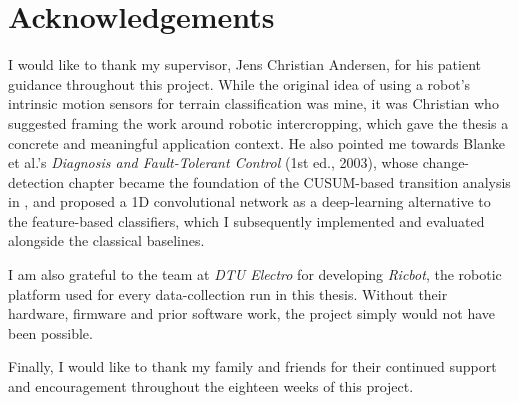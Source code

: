 \newpage
\section*{Acknowledgements}

I would like to thank my supervisor, Jens Christian Andersen, for his patient guidance throughout this project. While the original idea of using a robot's intrinsic motion sensors for terrain classification was mine, it was Christian who suggested framing the work around robotic intercropping, which gave the thesis a concrete and meaningful application context. He also pointed me towards Blanke et al.'s \emph{Diagnosis and Fault-Tolerant Control} (1st ed., 2003), whose change-detection chapter became the foundation of the CUSUM-based transition analysis in , and proposed a 1D convolutional network as a deep-learning alternative to the feature-based classifiers, which I subsequently implemented and evaluated alongside the classical baselines.

I am also grateful to the team at \emph{DTU Electro} for developing \emph{Ricbot}, the robotic platform used for every data-collection run in this thesis. Without their hardware, firmware and prior software work, the project simply would not have been possible.

Finally, I would like to thank my family and friends for their continued support and encouragement throughout the eighteen weeks of this project.